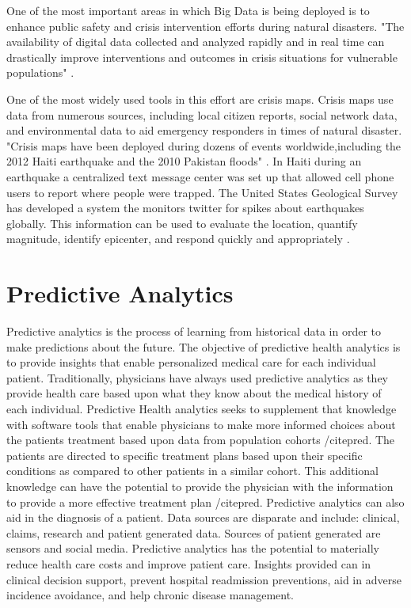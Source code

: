 \documentclass[sigconf]{acmart}
\begin{document}
One of the most important areas in which Big Data is being deployed is to enhance public safety and crisis intervention efforts during natural disasters. "The availability of digital data collected and analyzed rapidly and in real time can drastically improve interventions and outcomes in crisis situations for vulnerable populations" \cite{www-google-GloPls}.  

One of the most widely used tools in this effort are crisis maps. Crisis maps use data from numerous sources, including local citizen reports, social network data, and environmental data to aid emergency responders in times of natural disaster. "Crisis maps have been deployed during dozens of events worldwide,including the 2012 Haiti earthquake and the 2010 Pakistan floods" \cite{www-google-Hffpst}.
In Haiti during an earthquake a centralized text message center was set up that allowed cell phone users to report where people were trapped. The United States Geological Survey has developed a system the monitors twitter for spikes about earthquakes globally. This information can be used to evaluate the location, quantify magnitude, identify epicenter, and respond quickly and appropriately \cite{www-google-GloPls}.

\section{Predictive Analytics}

Predictive analytics is the process of learning from historical data in order to make predictions about the future. The objective of predictive health analytics is to provide insights that enable personalized medical care for each individual patient. Traditionally, physicians have always used predictive analytics as they provide health care based upon what they know about the medical history of each individual. Predictive Health analytics seeks to supplement that knowledge with software tools that enable physicians to make more informed choices about the patients treatment based upon data from population cohorts /cite{pred}.  The patients are directed to specific treatment plans based upon their specific conditions as compared to other patients in a similar cohort.  This additional knowledge can have the potential to provide the physician with the information to provide a more effective treatment plan /cite{pred}. Predictive analytics can also aid in the diagnosis of a patient. Data sources are disparate and include: clinical, claims, research and patient generated data. Sources of patient generated are sensors and social media.  
Predictive analytics has the potential to materially reduce health care costs and improve patient care.   Insights provided can in clinical decision support, prevent hospital readmission preventions, aid in adverse incidence avoidance, and help chronic disease management. 
  
\end{document}
